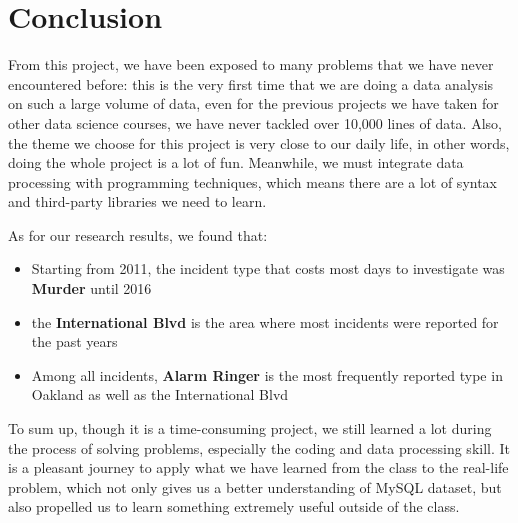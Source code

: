 \documentclass{article} %
\begin{document}
\begin{itemize}
\end{itemize}

\section{Conclusion}

From this project, we have been exposed to many problems that we have never encountered before: this is the very first time that we are doing a data analysis on such a large volume of data, even for the previous projects we have taken for other data science courses, we have never tackled over 10,000 lines of data. Also, the theme we choose for this project is very close to our daily life, in other words, doing the whole project is a lot of fun. Meanwhile, we must integrate data processing with programming techniques, which means there are a lot of syntax and third-party libraries we need to learn.

As for our research results, we found that: 
\begin{itemize}
	\item Starting from 2011, the incident type that costs most days to investigate was \textbf{Murder} until 2016
	\item the \textbf{International Blvd} is the area where most incidents were reported for the past years
	\item Among all incidents, \textbf{Alarm Ringer} is the most frequently reported type in Oakland as well as the International Blvd
\end{itemize}

To sum up, though it is a time-consuming project, we still learned a lot during the process of solving problems, especially the coding and data processing skill. It is a pleasant journey to apply what we have learned from the class to the real-life problem, which not only gives us a better understanding of MySQL dataset, but also propelled us to learn something extremely useful outside of the class.
\[\]




\end{document}
